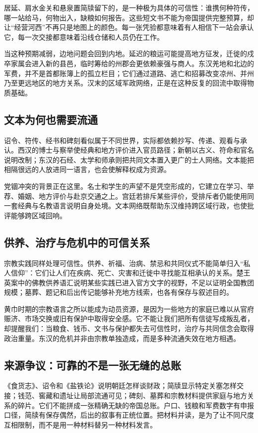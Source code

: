 居延、肩水金关和悬泉置简牍留下的，是一种极为具体的可信性：谁携何种符传，哪一站给马，何物出入，缺粮如何报告。这些短文书不能为帝国提供完整预算，却让“经营河西”不再只是地图上的颜色。每一张凭验都意味着有人相信下一站会承认它，每一次交接都意味着沿线仓储和人员仍在工作。

当这种预期减弱，边地问题会回到内地。延迟的粮运可能提高地方征发，迁徙的戍卒家属会进入新的县邑，临时筹给的州郡会更依赖豪强与商人。东汉羌地和北边的军费，并不是首都账簿上的孤立栏目；它们通过道路、逃亡和招募改变凉州、并州乃至更远地区的地方关系。汉末的区域军政网络，正是在这种反复的回流中取得物质基础。

\subsection{文本为何也需要流通}

诏令、符传、经书和碑刻看似属于不同世界，实际都依赖抄写、传递、观看与承认。西汉的博士与察举使经典和地方评价进入官员路径；新朝以古义、符命和官名说明改制；东汉的石经、太学和师承则把共同文本置入更广的士人网络。文本能把相隔很远的人放进同一语言，也会使解释权成为资源。

党锢冲突的背景正在这里。名士和学生的声望不是凭空形成的，它建立在学习、举荐、婚姻、地方评价与赴京交通之上。宫廷若排斥某些评价，受排斥者仍能使用同一套经典与名教语言说明自身处境。文本网络既帮助东汉维持跨区域行政，也使批评能够跨区域回响。

\subsection{供养、治疗与危机中的可信关系}

宗教实践同样处理可信性。供养、祈福、治病、禁忌和共同仪式不能简单归入“私人信仰”：它们让人们在疾病、死亡、灾害和迁徙中寻找能互相承认的关系。楚王英案中的佛教供养语汇说明某些实践已进入官方文字的视野，不足以证明全国教团规模；墓葬、题记和后出传记能够补充地方线索，也各有保存与叙述目的。

黄巾时期的宗教语言之所以能成为动员资源，是因为一些地方的家庭已难以从官府赈济、市场交换或旧有保护中取得安全感。它不能让我们把所有信徒写成叛乱者，却提醒我们：当粮食、钱币、文书与保护都失去可信性时，治疗与共同信念会取得政治重量。东汉的危机并非由宗教单独造成，而是多种流通失效在地方相遇。

\subsection{来源争议：可靠的不是一张无缝的总账}

《食货志》、诏令和《盐铁论》说明朝廷怎样谈财政；简牍显示特定关塞怎样交接；钱范、窖藏和遗址让局部流通可见；碑刻、墓葬和宗教材料提供家庭与地方关系的碎片。它们不能拼成一张精确无缺的帝国总账。户口、钱粮和军费数字有申报口径，简牍有保存偶然，后出的叙事有正统位置。把材料并读，是为了让不同尺度互相限制，而不是用一种材料替另一种材料发言。

